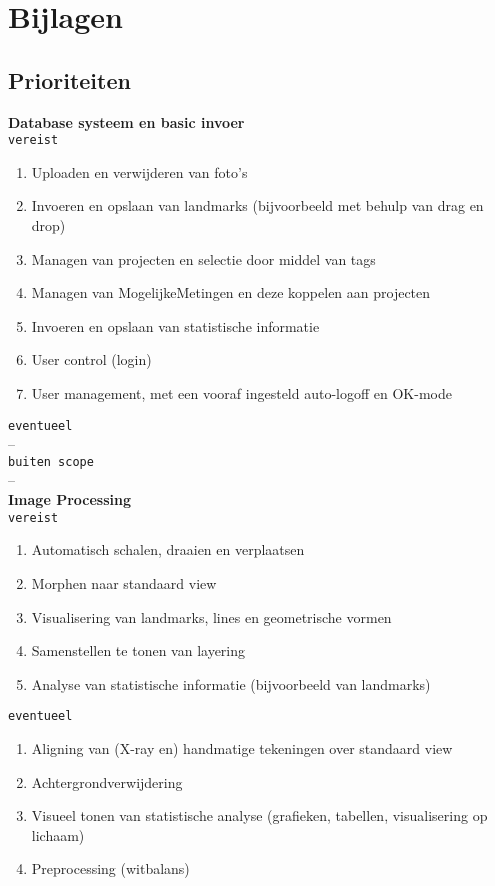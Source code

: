 \section{Bijlagen}
\label{Bijlagen}

\subsection{Prioriteiten}
\Large{\textbf{Database systeem en basic invoer}}
\\\verb!vereist!
\begin{enumerate}
	\item Uploaden en verwijderen van foto's
	\item Invoeren en opslaan van landmarks (bijvoorbeeld met behulp van drag en drop)
	\item Managen van projecten en selectie door middel van tags
	\item Managen van MogelijkeMetingen en deze koppelen aan projecten
	\item Invoeren en opslaan van statistische informatie
	\item User control (login)
	\item User management, met een vooraf ingesteld auto-logoff en OK-mode
\end{enumerate}
\verb!eventueel!
\\
--
\\\verb!buiten scope!\\
--
\\
\Large{\textbf{Image Processing}}
\\\verb!vereist!
\begin{enumerate}
	\item Automatisch schalen, draaien en verplaatsen
	\item Morphen naar standaard view
	\item Visualisering van landmarks, lines en geometrische vormen
	\item Samenstellen te tonen van layering
	\item Analyse van statistische informatie (bijvoorbeeld van landmarks)
\end{enumerate}
\verb!eventueel!
\begin{enumerate}
	\item Aligning van (X-ray en) handmatige tekeningen over standaard view
	\item Achtergrondverwijdering
	\item Visueel tonen van statistische analyse (grafieken, tabellen, visualisering op lichaam)
	\item Preprocessing (witbalans)
\end{enumerate}

